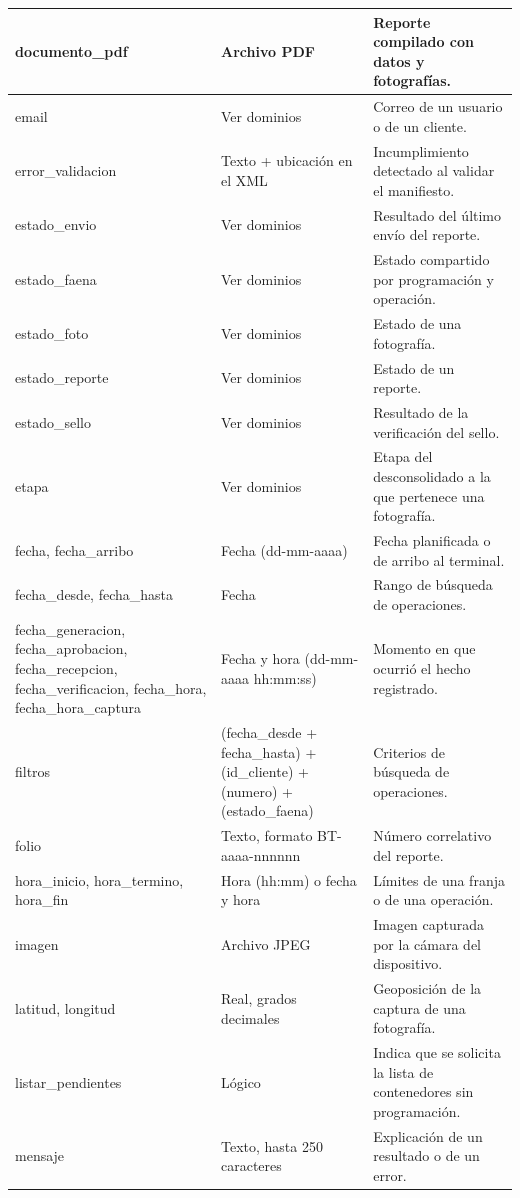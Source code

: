 {\begin{longtable}{|L{3.3cm}|L{3.3cm}|L{8.0cm}|}
documento\_pdf & Archivo PDF & Reporte compilado con datos y fotografías. \\ \hline
email & Ver dominios & Correo de un usuario o de un cliente. \\ \hline
error\_validacion & Texto + ubicación en el XML & Incumplimiento detectado al validar el
manifiesto. \\ \hline
estado\_envio & Ver dominios & Resultado del último envío del reporte. \\ \hline
estado\_faena & Ver dominios & Estado compartido por programación y operación. \\ \hline
estado\_foto & Ver dominios & Estado de una fotografía. \\ \hline
estado\_reporte & Ver dominios & Estado de un reporte. \\ \hline
estado\_sello & Ver dominios & Resultado de la verificación del sello. \\ \hline
etapa & Ver dominios & Etapa del desconsolidado a la que pertenece una fotografía. \\ \hline
fecha, fecha\_arribo & Fecha (dd-mm-aaaa) & Fecha planificada o de arribo al terminal. \\
\hline
fecha\_desde, fecha\_hasta & Fecha & Rango de búsqueda de operaciones. \\ \hline
fecha\_generacion, fecha\_aprobacion, fecha\_recepcion, fecha\_verificacion, fecha\_hora,
fecha\_hora\_captura & Fecha y hora (dd-mm-aaaa hh:mm:ss) & Momento en que ocurrió el
hecho registrado. \\ \hline
filtros & (fecha\_desde + fecha\_hasta) + (id\_cliente) + (numero) + (estado\_faena) &
Criterios de búsqueda de operaciones. \\ \hline
folio & Texto, formato BT-aaaa-nnnnnn & Número correlativo del reporte. \\ \hline
hora\_inicio, hora\_termino, hora\_fin & Hora (hh:mm) o fecha y hora & Límites de una franja
o de una operación. \\ \hline
imagen & Archivo JPEG & Imagen capturada por la cámara del dispositivo. \\ \hline
latitud, longitud & Real, grados decimales & Geoposición de la captura de una fotografía.
\\ \hline
listar\_pendientes & Lógico & Indica que se solicita la lista de contenedores sin
programación. \\ \hline
mensaje & Texto, hasta 250 caracteres & Explicación de un resultado o de un error. \\
\hline

\end{longtable}}
